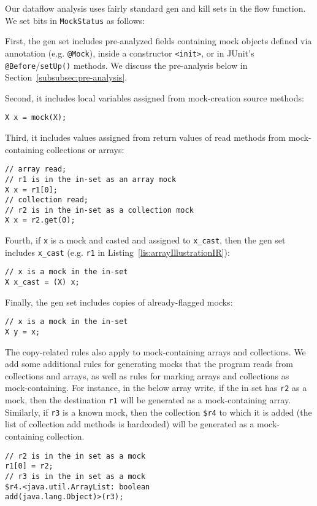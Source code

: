 

Our dataflow analysis uses fairly standard gen and kill sets in the flow function. We set bits in \texttt{MockStatus} as follows:

First, the gen set includes pre-analyzed fields containing mock objects defined via annotation (e.g. \texttt{@Mock}), inside a constructor \texttt{<init>}, or in JUnit's \texttt{@Before}/\texttt{setUp()} methods. We discuss the pre-analysis below in Section~\ref{subsubsec:pre-analysis}. 

Second, it includes local variables assigned from mock-creation source methods:
\begin{lstlisting}[basicstyle=\ttfamily\small,numbers=none]
X x = mock(X);
\end{lstlisting}

Third, it includes values assigned from return values of read methods from mock-containing collections or arrays:
\begin{lstlisting}[basicstyle=\ttfamily\small,numbers=none]
// array read;
// r1 is in the in-set as an array mock
X x = r1[0];
// collection read;
// r2 is in the in-set as a collection mock
X x = r2.get(0);
\end{lstlisting}

Fourth, if \texttt{x} is a mock and casted and assigned to \texttt{x\_cast}, then the gen set includes \texttt{x\_cast} (e.g. \texttt{r1} in Listing~\ref{lis:arrayIllustrationIR}):
\begin{lstlisting}[basicstyle=\ttfamily\small,numbers=none]
// x is a mock in the in-set
X x_cast = (X) x;
\end{lstlisting}

Finally, the gen set includes copies of already-flagged mocks:
\begin{lstlisting}[basicstyle=\ttfamily\small,numbers=none]
// x is a mock in the in-set
X y = x;
\end{lstlisting}
The copy-related rules also apply to mock-containing arrays and collections. We add some additional rules for generating mocks that the program reads from collections and arrays, as well as rules for marking arrays and collections as mock-containing. For instance, in the below array write, if the in set has \texttt{r2} as a mock, then the destination \texttt{r1} will be generated as a mock-containing array. Similarly, if \texttt{r3} is a known mock, then the collection \texttt{\$r4} to which it is added (the list of collection add methods is hardcoded) will be generated as a mock-containing collection.
\begin{lstlisting}[basicstyle=\ttfamily\small,numbers=none]
// r2 is in the in set as a mock
r1[0] = r2;
// r3 is in the in set as a mock
$r4.<java.util.ArrayList: boolean
add(java.lang.Object)>(r3);
\end{lstlisting}

